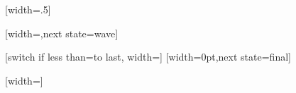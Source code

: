 \def\pgfpoint@oncoil#1#2#3{%
  \pgf@x=#1\pgfsnakesegmentamplitude%
  \pgf@x=\pgfsnakesegmentaspect\pgf@x%
  \pgf@y=#2\pgfsnakesegmentamplitude%
  \pgf@xa=0.083333333333\pgfsnakesegmentlength%
  \advance\pgf@x by#3\pgf@xa%
}


%

{
  [width=.5\pgfsnakesegmentlength]
  {
    \pgfpathcurveto
    {\pgfpoint{0pt}{.555\pgfsnakesegmentamplitude}}
    {\pgfpoint{0.11125\pgfsnakesegmentlength}{\pgfsnakesegmentamplitude}}
    {\pgfpoint{.25\pgfsnakesegmentlength}{\pgfsnakesegmentamplitude}}
    \pgfpathcurveto
    {\pgfpoint{.38875\pgfsnakesegmentlength}{\pgfsnakesegmentamplitude}}
    {\pgfpoint{.5\pgfsnakesegmentlength}{.5\pgfsnakesegmentamplitude}}
    {\pgfpoint{.5\pgfsnakesegmentlength}{0\pgfsnakesegmentamplitude}}
  }
  {
    \pgfpathlineto{\pgfpoint{\pgfsnakeremainingdistance}{0pt}}
  }
}



%

{
  [width=\pgfsnakesegmentlength,next state=wave]
  {}

  [switch if less than=\pgfsnakesegmentlength to last,
               width=\pgfsnakesegmentlength]
  {
    \pgfpathmoveto{
      \pgfpointadd
      {\pgfpoint{-\pgfsnakecompleteddistance}{0pt}}%
      {\pgfpointpolar{\pgfsnakesegmentangle}{\pgfsnakecompleteddistance}}}%
    \pgfpatharc{\pgfsnakesegmentangle}{-\pgfsnakesegmentangle}{\pgfsnakecompleteddistance}%
  }
  [width=0pt,next state=final]
  {
    \pgfpathmoveto{
      \pgfpointadd
      {\pgfpoint{-\pgfsnakecompleteddistance}{0pt}}%
      {\pgfpointpolar{\pgfsnakesegmentangle}{\pgfsnakecompleteddistance}}}%
    \pgfpatharc{\pgfsnakesegmentangle}{-\pgfsnakesegmentangle}{\pgfsnakecompleteddistance}%
  }
  {
    \pgfpathmoveto{\pgfpoint{\pgfsnakeremainingdistance}{0pt}}
  }
}



%

{
  [width=\pgfsnakesegmentlength]
  {
    \pgftransformxshift{\pgfsnakesegmentlength}
    \pgfpathmoveto{
      \pgfpointadd
      {\pgfpoint{-\pgfsnakesegmentobjectlength}{0pt}}%
      {\pgfpointpolar{\pgfsnakesegmentangle}{\pgfsnakesegmentobjectlength}}}%
    \pgfpatharc{\pgfsnakesegmentangle}{-\pgfsnakesegmentangle}{\pgfsnakesegmentobjectlength}%
  }
  {
    \pgfpathmoveto{\pgfpoint{\pgfsnakeremainingdistance}{0pt}}
  }
}


